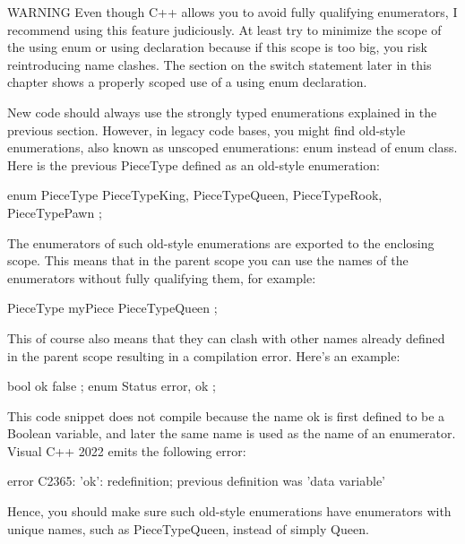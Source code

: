 \begin{myWarning}{WARNING}
Even though C++ allows you to avoid fully qualifying enumerators, I recommend using this feature judiciously. At least try to minimize the scope of the using enum or using declaration because if this scope is too big, you risk reintroducing name clashes. The section on the switch statement later in this chapter shows a properly scoped use of a using enum declaration.
\end{myWarning}


New code should always use the strongly typed enumerations explained in the previous section. However, in legacy code bases, you might find old-style enumerations, also known as unscoped enumerations: enum instead of enum class. Here is the previous PieceType defined as an old-style enumeration:

\begin{cpp}
enum PieceType { PieceTypeKing, PieceTypeQueen, PieceTypeRook, PieceTypePawn };
\end{cpp}

The enumerators of such old-style enumerations are exported to the enclosing scope. This means that in the parent scope you can use the names of the enumerators without fully qualifying them, for example:

\begin{cpp}
PieceType myPiece { PieceTypeQueen };
\end{cpp}

This of course also means that they can clash with other names already defined in the parent scope resulting in a compilation error. Here’s an example:

\begin{cpp}
bool ok { false };
enum Status { error, ok };
\end{cpp}

This code snippet does not compile because the name ok is first defined to be a Boolean variable, and later the same name is used as the name of an enumerator. Visual C++ 2022 emits the following error:

\begin{shell}
error C2365: 'ok': redefinition; previous definition was 'data variable'
\end{shell}

Hence, you should make sure such old-style enumerations have enumerators with unique names, such as PieceTypeQueen, instead of simply Queen.

